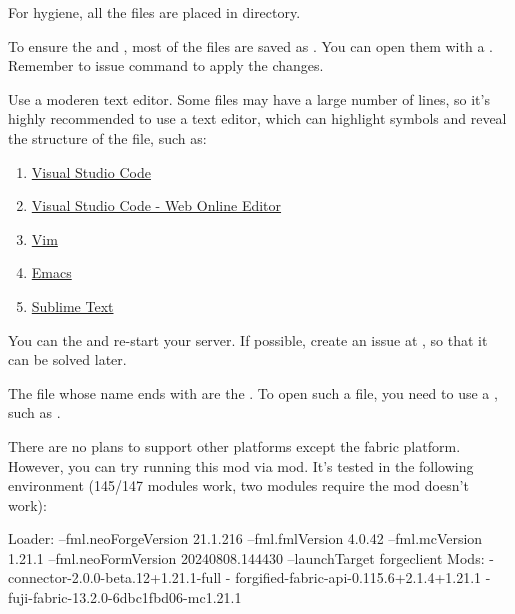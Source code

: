 \label{ch:q&a}


For hygiene, all the files are placed in  directory.


To ensure the  and , most of the files are saved as .
You can open them with a .
Remember to issue  command to apply the changes.

\begin{tips}{Use a moderen text editor.}
    Some files may have a large number of lines, so it's highly recommended to use a  text editor, which can highlight symbols and reveal the structure of the file, such as:
    \begin{enumerate}
        \item \href{https://code.visualstudio.com/}{Visual Studio Code}
        \item \href{https://vscode.dev/}{Visual Studio Code - Web Online Editor}
        \item \href{https://www.vim.org/}{Vim}
        \item \href{https://www.gnu.org/software/emacs/}{Emacs}
        \item \href{https://www.sublimetext.com/}{Sublime Text}
    \end{enumerate}
\end{tips}



You can  the  and re-start your server.
If possible, create an issue at \issueurl, so that it can be solved later.

The file whose name ends with  are the .
To open such a file, you need to use a , such as .


There are no plans to support other platforms except the fabric platform.
However, you can try running this mod via  mod.
It's tested in the following environment (145/147 modules work, two modules require the  mod doesn't work):
\begin{shcode}
    Loader: --fml.neoForgeVersion 21.1.216 --fml.fmlVersion 4.0.42 --fml.mcVersion 1.21.1 --fml.neoFormVersion 20240808.144430 --launchTarget forgeclient
    Mods:
    - connector-2.0.0-beta.12+1.21.1-full
    - forgified-fabric-api-0.115.6+2.1.4+1.21.1
    - fuji-fabric-13.2.0-6dbc1fbd06-mc1.21.1
\end{shcode}


